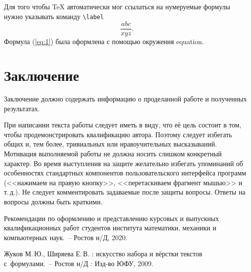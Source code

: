 \documentclass[14pt]{mmcs_article}
\begin{document}
Для того чтобы {\TeX} автоматически мог ссылаться на нумеруемые формулы нужно указывать команду \verb"\label"
\begin{equation}\label{eq:1}
  \frac{abc}{xyz}.
\end{equation}
Формула (\ref{eq:1}) была оформлена с помощью окружения \textsf{equation}.

\newpage
{}
\section*{Заключение}

Заключение должно содержать информацию о проделанной работе и полученных результатах.

При написании текста работы следует иметь в виду, что её цель состоит в том, чтобы продемонстрировать квалификацию автора. Поэтому следует избегать общих и, тем более, тривиальных или нравоучительных высказываний. Мотивация выполняемой работы не должна носить слишком конкретный характер. Во время выступления на защите желательно избегать упоминаний об особенностях стандартных компонентов пользовательского интерфейса программ (<<нажимаем на правую кнопку>>, <<перетаскиваем фрагмент мышью>> и т.\,д.). Не следует комментировать задаваемые после защиты вопросы. Ответы на вопросы должны быть краткими.



\newpage

\renewcommand{\refname}{\centering \textbf{Литература}}

\begin{thebibliography}{0}
  Рекомендации по оформлению
  и представлению курсовых
  и выпускных квалификационных работ
  студентов института математики,
  механики и компьютерных наук.~--
  Ростов н/Д, 2020.

  Жуков М.\,Ю., Ширяева Е.\,В.
  \LaTeXe: искусство набора и вёрстки текстов с~формулами.~-- Ростов н/Д : Изд-во ЮФУ, 2009.
\end{thebibliography}
\end{document}
